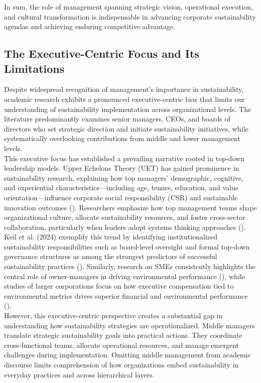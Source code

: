 	In sum, the role of management spanning strategic vision, operational execution, and cultural transformation is indispensable in advancing corporate sustainability agendas and achieving enduring competitive advantage.
	
	\subsection{The Executive-Centric Focus and Its Limitations}
	Despite widespread recognition of management’s importance in sustainability, academic research exhibits a pronounced executive-centric bias that limits our understanding of sustainability implementation across organizational levels. The literature predominantly examines senior managers, CEOs, and boards of directors who set strategic direction and initiate sustainability initiatives, while systematically overlooking contributions from middle and lower management levels. \\
	
	This executive focus has established a prevailing narrative rooted in top-down leadership models. Upper Echelons Theory (UET) has gained prominence in sustainability research, explaining how top managers’ demographic, cognitive, and experiential characteristics—including age, tenure, education, and value orientation—influence corporate social responsibility (CSR) and sustainable innovation outcomes (\textcite{Waldman2008, Ioannou2015}). Researchers emphasize how top management teams shape organizational culture, allocate sustainability resources, and foster cross-sector collaboration, particularly when leaders adopt systems thinking approaches (\textcite{Dyllick2016}). \\
	
	Keil et al. (2024) exemplify this trend by identifying institutionalized sustainability responsibilities such as board-level oversight and formal top-down governance structures as among the strongest predictors of successful sustainability practices (\textcite{keil2024c}). Similarly, research on SMEs consistently highlights the central role of owner-managers in driving environmental performance (\textcite{kutzschbach2021c}), while studies of larger corporations focus on how executive compensation tied to environmental metrics drives superior financial and environmental performance (\textcite{Eccles2014}). \\
	
	However, this executive-centric perspective creates a substantial gap in understanding how sustainability strategies are operationalized. Middle managers translate strategic sustainability goals into practical actions. They coordinate cross-functional teams, allocate operational resources, and manage emergent challenges during implementation. Omitting middle management from academic discourse limits comprehension of how organizations embed sustainability in everyday practices and across hierarchical layers. \\
	
